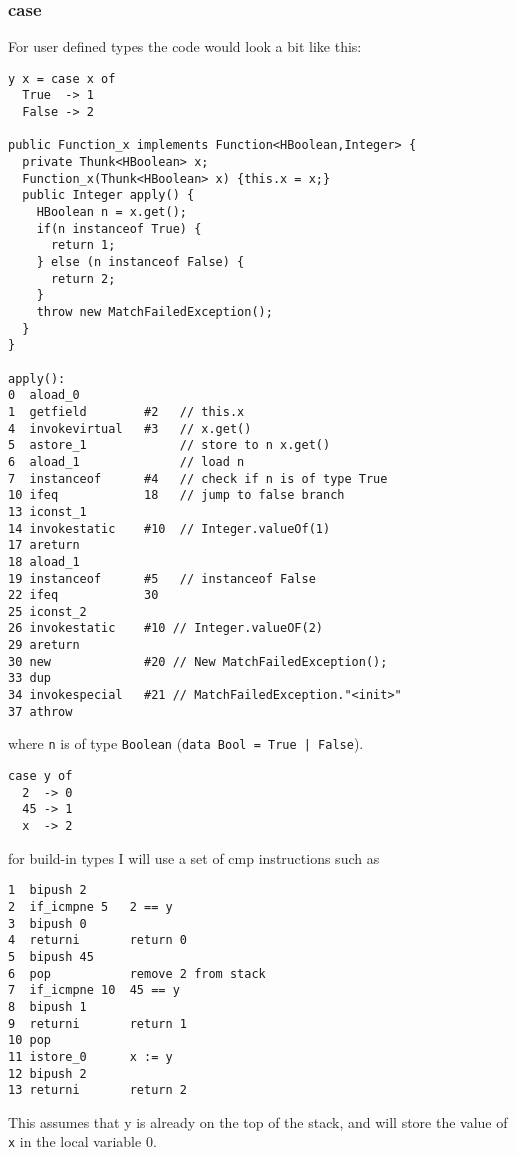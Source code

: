 \documentclass[12pt,a4paper,twoside]{article}
\begin{document}
\subsubsection{case}



For user defined types the code would look a bit like this:

\begin{verbatim}
y x = case x of
  True  -> 1
  False -> 2

public Function_x implements Function<HBoolean,Integer> {
  private Thunk<HBoolean> x;
  Function_x(Thunk<HBoolean> x) {this.x = x;}
  public Integer apply() {
    HBoolean n = x.get();
    if(n instanceof True) {
      return 1;
    } else (n instanceof False) {
      return 2;
    }
    throw new MatchFailedException();
  }
}

apply():
0  aload_0
1  getfield        #2   // this.x
4  invokevirtual   #3   // x.get()
5  astore_1             // store to n x.get()
6  aload_1              // load n
7  instanceof      #4   // check if n is of type True
10 ifeq            18   // jump to false branch 
13 iconst_1 
14 invokestatic    #10  // Integer.valueOf(1)
17 areturn
18 aload_1 
19 instanceof      #5   // instanceof False
22 ifeq            30
25 iconst_2       
26 invokestatic    #10 // Integer.valueOF(2)
29 areturn
30 new             #20 // New MatchFailedException();
33 dup
34 invokespecial   #21 // MatchFailedException."<init>"
37 athrow
\end{verbatim}

where \texttt{n} is of type \texttt{Boolean} (\texttt{data Bool = True | False}).


\begin{verbatim}
case y of
  2  -> 0
  45 -> 1
  x  -> 2
\end{verbatim}

for build-in types I will use a set of cmp instructions such as

\begin{verbatim}
1  bipush 2       
2  if_icmpne 5   2 == y
3  bipush 0      
4  returni       return 0
5  bipush 45
6  pop           remove 2 from stack
7  if_icmpne 10  45 == y
8  bipush 1    
9  returni       return 1
10 pop
11 istore_0      x := y
12 bipush 2      
13 returni       return 2
\end{verbatim}

This assumes that y is already on the top of the stack, and will store the value of \texttt{x} in the local
variable 0.
\end{document}
